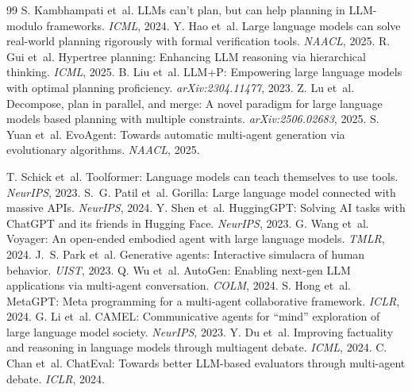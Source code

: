 \documentclass{article}
\begin{document}
\begin{thebibliography}{99}
 S. Kambhampati et~al. LLMs can't plan, but can help planning in LLM-modulo frameworks. \emph{ICML}, 2024.
 Y. Hao et~al. Large language models can solve real-world planning rigorously with formal verification tools. \emph{NAACL}, 2025.
 R. Gui et~al. Hypertree planning: Enhancing LLM reasoning via hierarchical thinking. \emph{ICML}, 2025.
 B. Liu et~al. LLM+P: Empowering large language models with optimal planning proficiency. \emph{arXiv:2304.11477}, 2023.
 Z. Lu et~al. Decompose, plan in parallel, and merge: A novel paradigm for large language models based planning with multiple constraints. \emph{arXiv:2506.02683}, 2025.
 S. Yuan et~al. EvoAgent: Towards automatic multi-agent generation via evolutionary algorithms. \emph{NAACL}, 2025.

 T. Schick et~al. Toolformer: Language models can teach themselves to use tools. \emph{NeurIPS}, 2023.
 S.~G. Patil et~al. Gorilla: Large language model connected with massive APIs. \emph{NeurIPS}, 2024.
 Y. Shen et~al. HuggingGPT: Solving AI tasks with ChatGPT and its friends in Hugging Face. \emph{NeurIPS}, 2023.
 G. Wang et~al. Voyager: An open-ended embodied agent with large language models. \emph{TMLR}, 2024.
 J.~S. Park et~al. Generative agents: Interactive simulacra of human behavior. \emph{UIST}, 2023.
 Q. Wu et~al. AutoGen: Enabling next-gen LLM applications via multi-agent conversation. \emph{COLM}, 2024.
 S. Hong et~al. MetaGPT: Meta programming for a multi-agent collaborative framework. \emph{ICLR}, 2024.
 G. Li et~al. CAMEL: Communicative agents for ``mind'' exploration of large language model society. \emph{NeurIPS}, 2023.
 Y. Du et~al. Improving factuality and reasoning in language models through multiagent debate. \emph{ICML}, 2024.
 C. Chan et~al. ChatEval: Towards better LLM-based evaluators through multi-agent debate. \emph{ICLR}, 2024.


\end{thebibliography}
\end{document}
